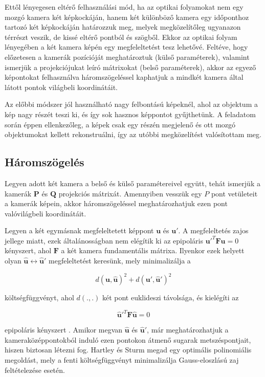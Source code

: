 Ettől lényegesen eltérő felhasználási mód, ha az optikai folyamokat nem egy mozgó kamera két képkockáján, hanem két különböző kamera egy időponthoz tartozó két képkockáján határozzuk meg, melyek megközelítőleg ugyanazon térrészt veszik, de kissé eltérő pontból és szögből. Ekkor az optikai folyam lényegében a két kamera képén egy megfeleltetést tesz lehetővé. Feltéve, hogy előzetesen a kamerák pozícióját meghatároztuk (külső paraméterek), valamint ismerjük a projekciójukat leíró mátrixokat (belső paraméterek), akkor az egyező képontokat felhasználva háromszögeléssel kaphatjuk a mindkét kamera által látott pontok világbeli koordinátáit.

Az előbbi módszer jól használható nagy felbontású képeknél, ahol az objektum a kép nagy részét teszi ki, és így sok hasznos képpontot gyűjthetünk. A feladatom során éppen ellenkezőleg, a képek csak egy részén megjelenő és ott mozgó objektumokat kellett rekonstruálni, így az utóbbi megközelítést valósítottam meg.


\subsection{Háromszögelés \label{sec:triangulation}}

Legyen adott két kamera a belső és külső paramétereivel együtt, tehát ismerjük a kamerák $\mathbf{P}$ és $\mathbf{Q}$ projekciós mátrixát. Amennyiben vesszük egy $P$ pont vetületeit a kamerák képein, akkor háromszögeléssel meghatározhatjuk ezen pont valóvilágbeli koordinátáit.

Legyen a két egymásnak megfeleltetett képpont $\mathbf{u}$ és $\mathbf{u}'$. A megfeleltetés zajos jellege miatt, ezek általánosságban nem elégítik ki az epipoláris $\mathbf{u}'^T \mathbf{F} \mathbf{u} = 0$ kényszert, ahol $\mathbf{F}$ a két kamera fundamentális mátrixa. Ilyenkor ezek helyett olyan $\mathbf{\hat{u}} \leftrightarrow \mathbf{\hat{u}}'$ megfeleltetést keresünk, mely minimalizálja a

\[d(\mathbf{u}, \mathbf{\hat{u}})^2 + d(\mathbf{u}', \mathbf{\hat{u}}')^2\]

költségfüggvényt, ahol $d(., .)$ két pont euklideszi távolsága, és kielégíti az

\[\mathbf{\hat{u}}'^T \mathbf{F} \mathbf{\hat{u}} = 0\]

epipoláris kényszert \cite{hartley-triangulation}. Amikor megvan $\mathbf{\hat{u}}$ és $\mathbf{\hat{u}}'$, már meghatározhatjuk a kameraközéppontokból induló ezen pontokon átmenő sugarak metszéspontjait, hiszen biztosan létezni fog. Hartley és Sturm \cite{hartley-triangulation} megad egy optimális polinomiális megoldást, mely a fenti költségfüggvényt minimalizálja Gauss-eloszlású zaj feltételezése esetén.

